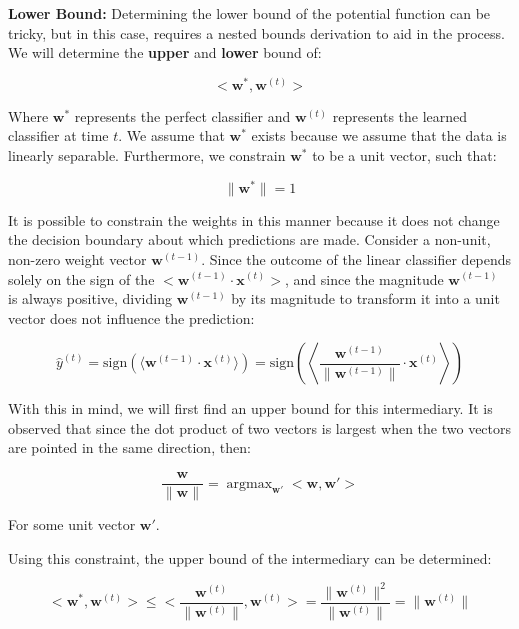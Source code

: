 \documentclass[11pt]{article}
\DeclareMathOperator*{\argmax}{argmax} %
\begin{document}
\textbf{Lower Bound: 
}
Determining the lower bound of the potential function can be tricky, but in this case, requires a nested bounds derivation to aid in the process. We will determine the \textbf{upper} and \textbf{lower} bound of:


$$\big< \boldsymbol{w}^*, \boldsymbol{w}^{(t)} \big>$$


Where $\boldsymbol{w}^*$ represents the perfect classifier and $\boldsymbol{w}^{(t)}$ represents the learned classifier at time $t$. We assume that $\boldsymbol{w}^*$ exists because we assume that the data is linearly separable. Furthermore, we constrain $\boldsymbol{w}^*$ to be a unit vector, such that:

$$\lVert \boldsymbol{w}^* \rVert = 1$$

It is possible to constrain the weights in this manner because it does not change the decision boundary about which predictions are made. Consider a non-unit, non-zero weight vector $\boldsymbol{w}^{(t-1)}$. Since the outcome of the linear classifier depends solely on the sign of the $\big< \boldsymbol{w}^{(t-1)} \cdot \boldsymbol{x}^{(t)} \big> $, and since the magnitude $\boldsymbol{w}^{(t-1)}$ is always positive, dividing $\boldsymbol{w}^{(t-1)}$ by its magnitude to transform it into a unit vector does not influence the prediction:

$$\hat{y}^{(t)} = \text{sign}\left(\langle \boldsymbol{w}^{(t-1)} \cdot \boldsymbol{x}^{(t)} \rangle\right) = \text{sign}\left(\left\langle \frac{\boldsymbol{w}^{(t-1)}}{\lVert\boldsymbol{w}^{(t-1)}\rVert} \cdot \boldsymbol{x}^{(t)} \right\rangle\right)$$

With this in mind, we will first find an upper bound for this intermediary. It is observed that since the dot product of two vectors is largest when the two vectors are pointed in the same direction, then:

$$\frac{\boldsymbol{w}}{\lVert \boldsymbol{w} \rVert} = \argmax_{\boldsymbol{w}'} \big< \boldsymbol{w}, \boldsymbol{w}' \big>$$

For some unit vector $\boldsymbol{w}'$.

Using this constraint, the upper bound of the intermediary can be determined:

$$\big< \boldsymbol{w}^*, \boldsymbol{w}^{(t)} \big> \leq 
\big< \frac{\boldsymbol{w}^{(t)}}{\lVert \boldsymbol{w}^{(t)} \rVert} , \boldsymbol{w}^{(t)} \big> = 
\frac{\lVert \boldsymbol{w}^{(t)} \rVert^2}{\lVert \boldsymbol{w}^{(t)} \rVert} = 
\lVert \boldsymbol{w}^{(t)} \rVert$$
\end{document}
